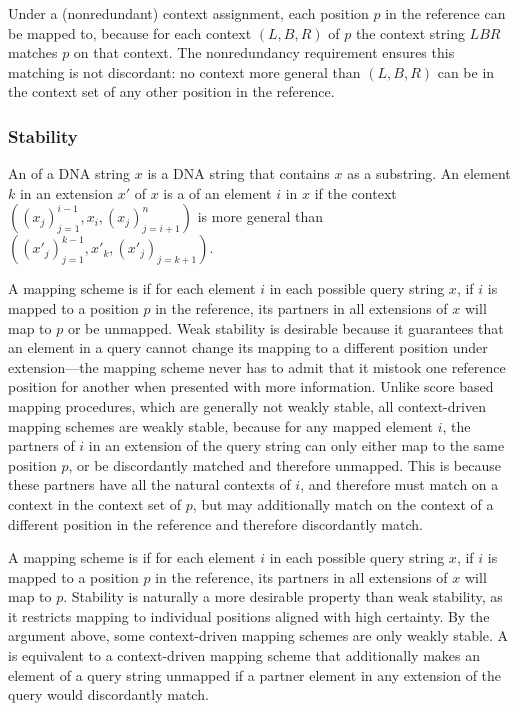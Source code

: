 Under a (nonredundant) context assignment, each position $p$ in the reference can be mapped to, because for each context $(L, B, R)$ of $p$ the context string $LBR$ matches $p$ on that context. The nonredundancy requirement ensures this matching is not discordant: no context more general than $(L, B, R)$ can be in the context set of any other position in the reference.

\subsubsection{Stability}
An  of a DNA string $x$ is a DNA string that contains $x$ as a substring.  
An element $k$ in an extension $x'$ of $x$ is a  of an element $i$ in $x$  if the context $((x_j)_{j=1}^{i-1}, x_i, (x_j)_{j=i+1}^n)$ is more general than $((x'_j)_{j=1}^{k-1}, x'_k, (x'_j)_{j=k+1})$.

A mapping scheme is  
if for each element $i$ in each possible query string $x$, if $i$ is mapped to a position $p$ in the reference, its partners in all extensions of $x$ will map to $p$ or be unmapped.
Weak stability is desirable because it guarantees that an element in a query cannot change its mapping to a different position under extension---the mapping scheme never has to admit that it mistook one reference position for another when presented with more information. Unlike score based mapping procedures, which are generally not weakly stable, all context-driven mapping schemes are weakly stable, because for any mapped element $i$, the partners of $i$ in an extension of the query string can only either map to the same position $p$, or be discordantly matched and therefore unmapped. This is because these partners have all the natural contexts of $i$, and therefore must match on a context in the context set of $p$, but may additionally match on the context of a different position in the reference and therefore discordantly match.

A mapping scheme is  
if for each element $i$ in each possible query string $x$, if $i$ is mapped to a position $p$ in the reference, its partners in all extensions of $x$ will map to $p$. Stability is naturally a more desirable property than weak stability, as it restricts mapping to individual positions aligned with high certainty.
By the argument above, some context-driven mapping schemes are only weakly stable. A  is equivalent to a context-driven mapping scheme that additionally makes an element of a query string unmapped if a partner element in any extension of the query would discordantly match. 

